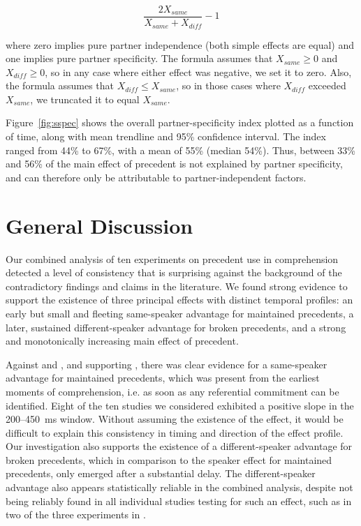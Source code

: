 \documentclass[doc,fignum,apacite,floatsintext]{apa6}
\begin{document}
$$\frac{2X_{same}}{X_{same} + X_{diff}}-1$$

\noindent where zero implies pure partner independence (both simple effects are equal) and one implies pure partner specificity.  The formula assumes that $X_{same} \ge 0$ and $X_{diff} \ge 0$, so in any case where either effect was negative, we set it to zero.  Also, the formula assumes that $X_{diff} \le X_{same}$, so in those cases where $X_{diff}$ exceeded $X_{same}$, we truncated it to equal $X_{same}$.

Figure~\ref{fig:sspec} shows the overall partner-specificity index plotted as a function of time, along with mean trendline and 95\% confidence interval.  The index ranged from 44\% to 67\%, with a mean of 55\% (median 54\%).  Thus, between 33\% and 56\% of the main effect of precedent is not explained by partner specificity, and can therefore only be attributable to partner-independent factors.

\section{General Discussion}

Our combined analysis of ten experiments on precedent use in comprehension detected a level of consistency that is surprising against the background of the contradictory findings and claims in the literature.  We found strong evidence to support the existence of three principal effects with distinct temporal profiles: an early but small and fleeting same-speaker advantage for maintained precedents, a later, sustained different-speaker advantage for broken precedents, and a strong and monotonically increasing main effect of precedent.

Against  and , and supporting , there was clear evidence for a same-speaker advantage for maintained precedents, which was present from the earliest moments of comprehension, i.e. as soon as any referential commitment can be identified. Eight of the ten studies we considered exhibited a positive slope in the 200--450~ms window.  Without assuming the existence of the effect, it would be difficult to explain this consistency in timing and direction of the effect profile.  Our investigation also supports the existence of a different-speaker advantage for broken precedents, which in comparison to the speaker effect for maintained precedents, only emerged after a substantial delay.  The different-speaker advantage also appears statistically reliable in the combined analysis, despite not being reliably found in all individual studies testing for such an effect, such as in two of the three experiments in .
\end{document}
